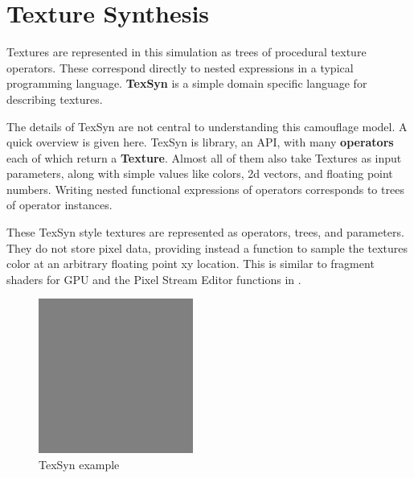 \documentclass[sigconf]{acmart}
\begin{document}
\section{Texture Synthesis}
Textures are represented in this simulation as trees of procedural texture operators. These correspond directly to nested expressions in a typical programming language. \textbf{TexSyn} is a simple domain specific language for describing textures.
\par
The details of TexSyn are not central to understanding this camouflage model. A quick overview is given here. TexSyn is library, an API, with many \textbf{operators} each of which return a \textbf{Texture}. Almost all of them also take Textures as input parameters, along with simple values like colors, 2d vectors, and floating point numbers. Writing nested functional expressions of operators corresponds to trees of operator instances.
\par
These TexSyn style textures are represented as operators, trees, and parameters. They do not store pixel data, providing instead a function to sample the textures color at an arbitrary floating point xy location. This is similar to fragment shaders for GPU and the Pixel Stream Editor functions in \cite{perlin_image_1985}.
\par

\begin{figure}
    \includegraphics[width=\linewidth,height=2in]{images/middle_gray_pixel.png}
    \caption{TexSyn example}
    \label{fig:TexSyn_example}
\end{figure}
\end{document}
